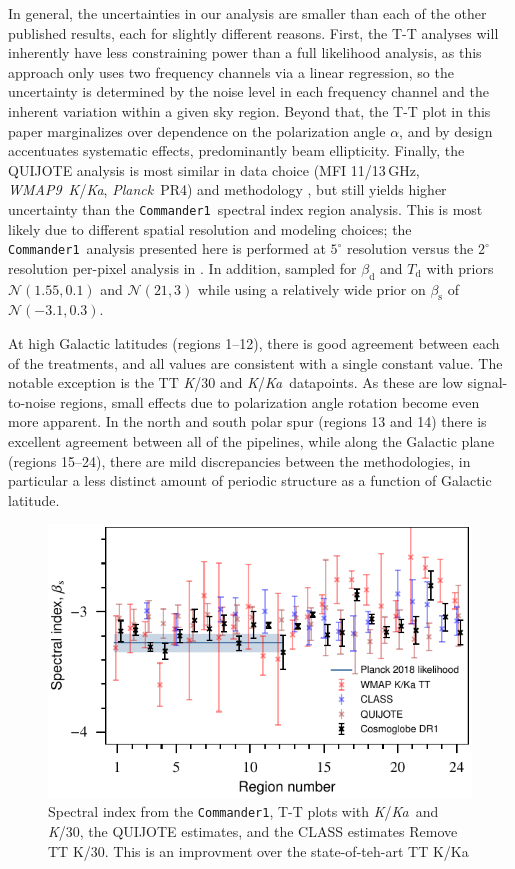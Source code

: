 \documentclass[twocolumn]{../../common/aa}
\def\WMAPnine{\emph{WMAP9}}
\def\Planck{\emph{Planck}}
\def\commanderone{\texttt{Commander1}}
\newcommand{\K}[0]{\textit K}
\newcommand{\Ka}[0]{\textit{Ka}}
\begin{document}
In general, the uncertainties in our analysis are smaller than each of the other published results, each for slightly different reasons. First, the T-T analyses will inherently have less constraining power than a full likelihood analysis, as this approach only uses two frequency channels via a linear regression, so the uncertainty is determined by the noise level in each frequency channel and the inherent variation within a given sky region. Beyond that, the T-T plot in this paper marginalizes over dependence on the polarization angle $\alpha$, and by design accentuates systematic effects, predominantly beam ellipticity. Finally, the QUIJOTE analysis is most similar in data choice (MFI 11/13\,GHz, \WMAPnine\ \K/\Ka, \Planck\ PR4) and methodology \citep[\texttt{B-SeCRET};][]{b-secret}, but still yields higher uncertainty than the \commanderone\ spectral index region analysis. This is most likely due to different spatial resolution and modeling choices; the \commanderone\ analysis presented here is performed at $5^\circ$ resolution versus the $2^\circ$ resolution per-pixel analysis in \citet{QUIJOTE_VIII}. In addition, \citet{QUIJOTE_VIII} sampled for $\beta_\mathrm d$ and $T_\mathrm{d}$ with priors $\mathcal N(1.55,0.1)$ and $\mathcal N(21,3)$ while using a relatively wide prior on $\beta_\mathrm s$ of $\mathcal N(-3.1, 0.3)$.

At high Galactic latitudes (regions 1--12), there is good agreement between each of the treatments, and all values are consistent with a single constant value. The notable exception is the TT \K/30 and \K/\Ka\ datapoints. As these are low signal-to-noise regions, small effects due to polarization angle rotation become even more apparent. In the north and south polar spur (regions 13 and 14) there is excellent agreement between all of the pipelines, while along  the Galactic plane (regions 15--24), there are mild discrepancies between the methodologies, in particular a less distinct amount of periodic structure as a function of Galactic latitude.

\begin{figure}
	\centering
	\includegraphics[width=\columnwidth]{figures/compare_betas.pdf}
	\caption{Spectral index from the \commanderone, T-T plots with \K /\Ka\ and \K/30, the QUIJOTE estimates, and the CLASS estimates
	Remove TT K/30.
	This is an improvment over the state-of-teh-art TT K/Ka
	}
	\label{fig:beta_comp}
\end{figure}
\end{document}
